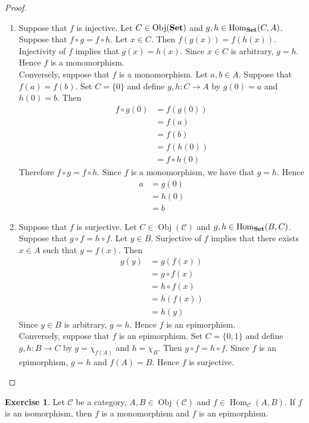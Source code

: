 \documentclass[12pt]{amsart}
\theoremstyle{definition}
\newtheorem{ex}[definition]{Exercise}
\newcommand{\MC}{\mathcal{C}}
\newcommand{\tbf}[1]{\textbf{#1}}
\DeclareMathOperator{\Obj}{Obj}
\DeclareMathOperator{\Hom}{Hom}
\DeclareMathOperator*{\Set}{\text{\tbf{Set}}}
\DeclareMathOperator*{\0}{\mbf{0}}
\DeclareMathOperator*{\1}{\mbf{1}}
\newcommand{\lex}[1]{\label{ex:#1}}
\begin{document}
	\begin{proof}\
		\begin{enumerate}
			\item Suppose that $f$ is injective. Let $C \in \Obj(\Set)$ and $g,h \in \Hom_{\Set}(C, A)$. Suppose that $f \circ g = f \circ h$. Let $x \in C$. Then $f(g(x)) = f(h(x))$. Injectivity of $f$ implies that $g(x) = h(x)$. Since $x \in C$ is arbitrary, $g = h$. Hence $f$ is a monomorphism. \\
			Conversely, suppose that $f$ is a monomorphism. Let $a, b \in A$. Suppose that $f(a) = f(b)$. Set $C = \{0\}$ and define $g,h: C \rightarrow A$ by $g(0) = a$ and $h(0) = b$. Then  
			\begin{align*}
				f \circ g(0) 
				& = f(g(0)) \\
				& = f(a) \\
				& = f(b) \\
				& = f(h(0)) \\
				& = f \circ h(0) 
			\end{align*}
			Therefore $f \circ g = f \circ h$. Since $f$ is a monomorphism, we have that $g = h$. Hence 
			\begin{align*}
				a 
				& = g(0) \\
				& = h(0) \\
				& = b
			\end{align*}
			\item Suppose that $f$ is surjective. Let $C \in \Obj(\MC)$ and $g,h \in \Hom_{\Set}(B, C)$. Suppose that $g \circ f = h \circ f$. Let $y \in B$. Surjective of $f$ implies that there exists $x \in A$ such that $y = f(x)$. 
			Then 
			\begin{align*}
				g(y)
				& = g(f(x)) \\
				& = g \circ f (x) \\
				& = h \circ f (x) \\
				& = h(f(x)) \\
				& = h(y) 
			\end{align*}
			Since $y \in B$ is arbitrary, $g = h$. Hence $f$ is an epimorphism. \\
			Conversely, suppose that $f$ is an epimorphism. Set $C = \{0,1\}$ and define $g, h: B \rightarrow C$ by $g = \chi_{f(A)}$ and $h = \chi_{B}$. Then $g \circ f = h \circ f$. Since $f$ is an epimorphism, $g = h$ and $f(A) = B$. Hence $f$ is surjective.  
		\end{enumerate}
	\end{proof}
	
	\begin{ex} \lex{15011}
		Let $\MC$ be a category, $A,B \in \Obj(\MC)$ and $f \in \Hom_{\MC}(A, B)$. If $f$ is an isomorphism, then $f$ is a monomorphism and $f$ is an epimorphism. 
	\end{ex}
	
\end{document}
